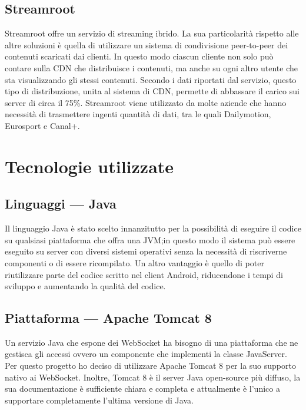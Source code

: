 	\subsection{Streamroot}
	Streamroot offre un servizio di streaming ibrido. La sua particolarità rispetto alle altre soluzioni è quella di utilizzare un sistema di condivisione peer-to-peer dei contenuti scaricati dai clienti. In questo modo ciascun cliente non solo può contare sulla CDN che distribuisce i contenuti, ma anche su ogni altro utente che sta visualizzando gli stessi contenuti. Secondo i dati riportati dal servizio, questo tipo di distribuzione, unita al sistema di CDN, permette di abbassare il carico sui server di circa il 75\%. Streamroot viene utilizzato da molte aziende che hanno necessità di trasmettere ingenti quantità di dati, tra le quali Dailymotion, Eurosport e Canal+.

\section{Tecnologie utilizzate}
	\subsection{Linguaggi --- Java}
	Il linguaggio Java è stato scelto innanzitutto per la possibilità di eseguire il codice su qualsiasi piattaforma che offra una JVM;\@ in questo modo il sistema può essere eseguito su server con diversi sistemi operativi senza la necessità di riscriverne componenti o di essere ricompilato. Un altro vantaggio è quello di poter riutilizzare parte del codice scritto nel client Android, riducendone i tempi di sviluppo e aumentando la qualità del codice.

	\subsection{Piattaforma --- Apache Tomcat 8}
	Un servizio Java che espone dei WebSocket ha bisogno di una piattaforma che ne gestisca gli accessi ovvero un componente che implementi la classe JavaServer. Per questo progetto ho deciso di utilizzare Apache Tomcat 8 per la suo supporto nativo ai WebSocket. Inoltre, Tomcat 8 è il server Java open-source più diffuso, la sua documentazione è sufficiente chiara e completa e attualmente è l'unico a supportare completamente l'ultima versione di Java.

